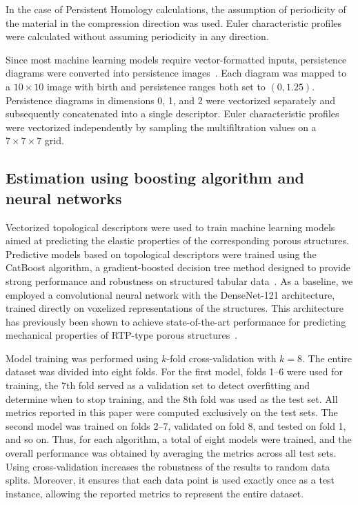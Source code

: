 \documentclass[sn-mathphys,Numbered]{sn-jnl}
\theoremstyle{definition}
\begin{document}
In the case of Persistent Homology calculations, the assumption of periodicity of the material in the  compression direction was used. Euler characteristic profiles were calculated without assuming periodicity in any direction. 


Since most machine learning models require vector-formatted inputs, persistence diagrams were converted into persistence images~\cite{JMLR:v18:16-337}. Each diagram was mapped to a $10 \times 10$ image with birth and persistence ranges both set to $(0, 1.25)$. Persistence diagrams in dimensions 0, 1, and 2 were vectorized separately and subsequently concatenated into a single descriptor. Euler characteristic profiles were vectorized independently by sampling the multifiltration values on a $7 \times 7 \times 7$ grid.

\subsection{Estimation using boosting algorithm and neural networks}

Vectorized topological descriptors were used to train machine learning models aimed at predicting the elastic properties of the corresponding porous structures. Predictive models based on topological descriptors were trained using the CatBoost algorithm, a gradient-boosted decision tree method designed to provide strong performance and robustness on structured tabular data~\cite{Prokhorenkova2019}. As a baseline, we employed a convolutional neural network with the DenseNet-121 architecture, trained directly on voxelized representations of the structures. This architecture has previously been shown to achieve state-of-the-art performance for predicting mechanical properties of RTP-type porous structures~\cite{praca_z_madrytem}.

Model training was performed using $k$-fold cross-validation with $k = 8$. The entire dataset was divided into eight folds. For the first model, folds 1–6 were used for training, the 7th fold served as a validation set to detect overfitting and determine when to stop training, and the 8th fold was used as the test set. All metrics reported in this paper were computed exclusively on the test sets. The second model was trained on folds 2–7, validated on fold 8, and tested on fold 1, and so on. Thus, for each algorithm, a total of eight models were trained, and the overall performance was obtained by averaging the metrics across all test sets. Using cross-validation increases the robustness of the results to random data splits. Moreover, it ensures that each data point is used exactly once as a test instance, allowing the reported metrics to represent the entire dataset.
\end{document}
